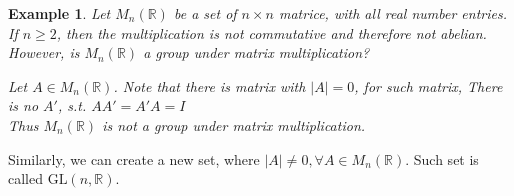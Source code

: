 \documentclass{article}
\theoremstyle{MyNonumberplain}
\theoremstyle{break}
\theoremstyle{break}
\newtheorem{example}{Example}[section]
\theoremstyle{break}
\theoremstyle{definition}
\theoremstyle{break}
\begin{document}
\begin{expbox}
    \begin{example}
        Let $M_n (\mathbb{R})$ be a set of $n \times n$ matrice, with all real number entries.\\

        If $n \geq 2$, then the multiplication is not commutative and therefore not abelian.\\

        However, is $M_n (\mathbb{R})$ a group under matrix multiplication?

        \begin{ansbox}
            Let $A \in M_n (\mathbb{R})$. Note that there is matrix with $| A | = 0$, for such matrix, There is no
            $A'$, s.t. $A A' = A' A = I$\\
    
            Thus $M_n (\mathbb{R})$ is not a group under matrix multiplication.    
        \end{ansbox}

    
    \end{example}
\end{expbox}

Similarly, we can create a new set, where $| A | \neq 0, \forall A \in M_n
(\mathbb{R})$. Such set is called $\text{GL} (n, \mathbb{R})$.
\end{document}
